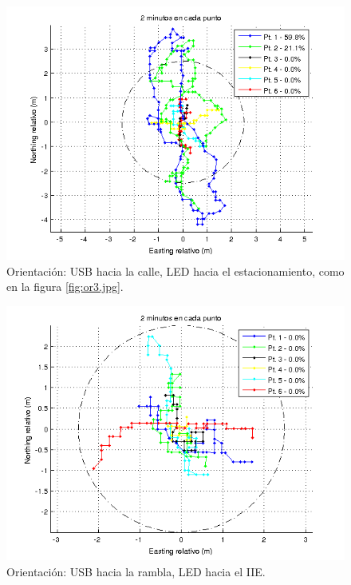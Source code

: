 \documentclass[spanish,12pt,a4paper,titlepage]{report}
\begin{document}
\newpage
\begin{figure}[h!]
  \includegraphics[width=.9\textwidth]{./img/2m_or1_todos.png}
  \caption{Orientación: USB hacia la calle, LED hacia el estacionamiento, como en la figura \ref{fig:or3.jpg}.}
\vspace{-30pt}
  \label{fig:2m_or1_todos.png}
\end{figure}

\begin{figure}[h!]
  \includegraphics[width=1\textwidth]{./img/2m_or2_todos.png}
  \caption{Orientación: USB hacia la rambla, LED hacia el IIE.}
  \label{fig:2m_or2_todos.png}
\end{figure}
\end{document}
